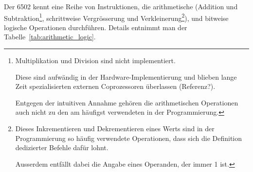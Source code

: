 \documentclass[11pt]{scrartcl}
\begin{document}
Der 6502 kennt eine Reihe von Instruktionen, die arithmetische
(Addition und Subtraktion\footnote{Multiplikation und Division sind
  nicht implementiert.

  Diese sind aufwändig in der Hardware-Implementierung und blieben
  lange Zeit spezialisierten externen Coprozessoren überlassen
  (Referenz?).

  Entgegen der intuitiven Annahme gehören die arithmetischen
  Operationen auch nicht zu den am häufigst verwendeten in der
  Programmierung.}, schrittweise Vergrösserung und
Verkleinerung\footnote{Dieses Inkrementieren und Dekrementieren eines Werts
  sind in der Programmierung so häufig verwendete Operationen, dass
  sich die Definition dedizierter Befehle dafür lohnt.

  Ausserdem entfällt dabei die Angabe eines Operanden, der immer 1
  ist.}),
und bitweise logische Operationen durchführen. Details
entnimmt man der Tabelle~\ref{tab:arithmetic_logic}.
\end{document}
